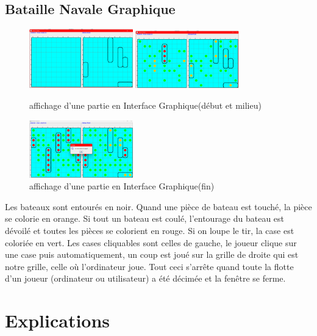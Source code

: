 \documentclass[12pt]{article}
\begin{document}
\subsection{Bataille Navale Graphique}
\begin{figure}[h]
\center
\includegraphics[width=0.4\textwidth]{./images/debutPartieGr.png}
\includegraphics[width=0.4\textwidth]{./images/milieuPartieGra.png}
\caption{affichage d'une partie en Interface Graphique(début et milieu)\label{img:figure2}}
\end{figure}

\begin{figure}[h]
\center

\includegraphics[width=0.4\textwidth]{./images/finPartieGraphique.png}
\caption{affichage d'une partie en Interface Graphique(fin)\label{img:figure2}}
\end{figure}

Les bateaux sont entourés en noir. Quand une pièce de bateau est touché, la pièce se colorie en orange. Si tout un bateau est coulé, l'entourage du bateau est dévoilé et toutes les pièces se colorient en rouge. Si on loupe le tir, la case est coloriée en vert.
Les cases cliquables sont celles de gauche, le joueur clique sur une case puis automatiquement, un coup est joué sur la grille de droite qui est notre grille, celle où l'ordinateur joue.
Tout ceci s'arrête quand toute la flotte d'un joueur (ordinateur ou utilisateur) a été décimée et la fenêtre se ferme.

\section{Explications}
\end{document}
